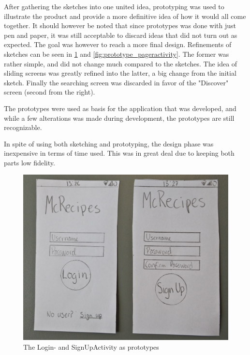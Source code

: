 After gathering the sketches into one united idea, prototyping was used to illustrate the product and provide a more definitive idea of how it would all come together. It should however be noted that since prototypes was done with just pen and paper, it was still acceptable to discard ideas that did not turn out as expected. The goal was however to reach a more final design. Refinements of sketches can be seen in \ref{fig:prototype_login} and \ref{fig:prototype_pageractivity}. The former was rather simple, and did not change much compared to the sketches. The idea of sliding screens was greatly refined into the latter, a big change from the initial sketch. Finally the searching screen was discarded in favor of the "Discover" screen (second from the right).

The prototypes were used as basis for the application that was developed, and while a few alterations was made during development, the prototypes are still  recognizable.

In spite of using both sketching and prototyping, the design phase was inexpensive in terms of time used. This was in great deal due to keeping both parts low fidelity.

\begin{figure}[H]
	\centering
	\includegraphics[width=\textwidth]{Pictures/prototype_login.jpg}
	\caption{The Login- and SignUpActivity as prototypes}
	\label{fig:prototype_login}
\end{figure}

